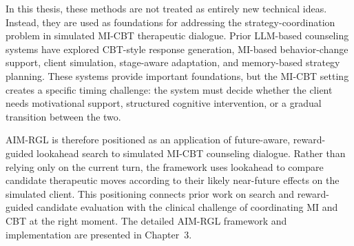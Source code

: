 In this thesis, these methods are not treated as entirely new technical ideas. Instead, they are used as foundations for addressing the strategy-coordination problem in simulated MI-CBT therapeutic dialogue. Prior LLM-based counseling systems have explored CBT-style response generation, MI-based behavior-change support, client simulation, stage-aware adaptation, and memory-based strategy planning. These systems provide important foundations, but the MI-CBT setting creates a specific timing challenge: the system must decide whether the client needs motivational support, structured cognitive intervention, or a gradual transition between the two.

AIM-RGL is therefore positioned as an application of future-aware, reward-guided lookahead search to simulated MI-CBT counseling dialogue. Rather than relying only on the current turn, the framework uses lookahead to compare candidate therapeutic moves according to their likely near-future effects on the simulated client. This positioning connects prior work on search and reward-guided candidate evaluation with the clinical challenge of coordinating MI and CBT at the right moment. The detailed AIM-RGL framework and implementation are presented in Chapter~3.